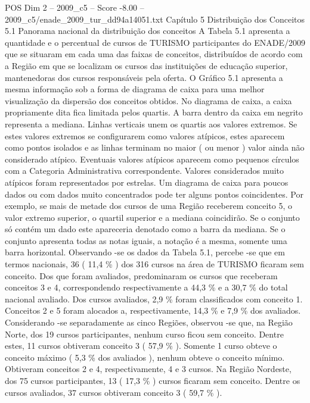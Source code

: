 \begin{textsample}{POS Dim 2 – 2009\_c5 – Score -8.00 – 2009\_c5/enade\_2009\_tur\_dd94a14051.txt}  \label{ex:f2_pos_424}
Capítulo 5 Distribuição dos Conceitos 5.1 Panorama nacional da distribuição dos conceitos A Tabela 5.1 apresenta a quantidade e o percentual de cursos de TURISMO participantes do ENADE/2009 que se situaram em cada uma das faixas de conceitos, distribuídos de acordo com a Região em que se localizam os cursos das instituições de educação superior, mantenedoras dos cursos responsáveis pela oferta.
O Gráfico 5.1 apresenta a mesma informação sob a forma de diagrama de caixa para uma melhor visualização da dispersão dos conceitos obtidos.
No diagrama de caixa, a caixa propriamente dita fica limitada pelos quartis.
A barra dentro da caixa em negrito representa a mediana.
Linhas verticais unem os quartis aos valores extremos.
Se estes valores extremos se configurarem como valores atípicos, estes aparecem como pontos isolados e as linhas terminam no maior ( ou menor ) valor ainda não considerado atípico.
Eventuais valores atípicos aparecem como pequenos círculos com a Categoria Administrativa correspondente.
Valores considerados muito atípicos foram representados por estrelas.
Um diagrama de caixa para poucos dados ou com dados muito concentrados pode ter alguns pontos coincidentes.
Por exemplo, se mais de metade dos cursos de uma Região receberem conceito 5, o valor extremo superior, o quartil superior e a mediana coincidirão.
Se o conjunto só contém um dado este apareceria denotado como a barra da mediana.
Se o conjunto apresenta todas as notas iguais, a notação é a mesma, somente uma barra horizontal.
Observando -se os dados da Tabela 5.1, percebe -se que em termos nacionais, 36 ( 11,4 \% ) dos 316 cursos na área de TURISMO ficaram sem conceito.
Dos que foram avaliados, predominaram os cursos que receberam conceitos 3 e 4, correspondendo respectivamente a 44,3 \% e a 30,7 \% do total nacional avaliado.
Dos cursos avaliados, 2,9 \% foram classificados com conceito 1.
Conceitos 2 e 5 foram alocados a, respectivamente, 14,3 \% e 7,9 \% dos avaliados.
Considerando -se separadamente as cinco Regiões, observou -se que, na Região Norte, dos 19 cursos participantes, nenhum curso ficou sem conceito.
Dentre estes, 11 cursos obtiveram conceito 3 ( 57,9 \% ).
Somente 1 curso obteve o conceito máximo ( 5,3 \% dos avaliados ), nenhum obteve o conceito mínimo.
Obtiveram conceitos 2 e 4, respectivamente, 4 e 3 cursos.
Na Região Nordeste, dos 75 cursos participantes, 13 ( 17,3 \% ) cursos ficaram sem conceito.
Dentre os cursos avaliados, 37 cursos obtiveram conceito 3 ( 59,7 \% ).

\end{textsample}
